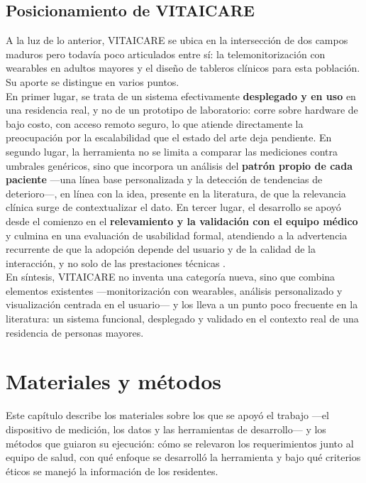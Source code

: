 \subsection{Posicionamiento de VITAICARE}
A la luz de lo anterior, VITAICARE se ubica en la intersección de dos campos maduros pero todavía poco articulados entre sí: la telemonitorización con wearables en adultos mayores y el diseño de tableros clínicos para esta población. Su aporte se distingue en varios puntos.\\

En primer lugar, se trata de un sistema efectivamente \textbf{desplegado y en uso} en una residencia real, y no de un prototipo de laboratorio: corre sobre hardware de bajo costo, con acceso remoto seguro, lo que atiende directamente la preocupación por la escalabilidad que el estado del arte deja pendiente. En segundo lugar, la herramienta no se limita a comparar las mediciones contra umbrales genéricos, sino que incorpora un análisis del \textbf{patrón propio de cada paciente} —una línea base personalizada y la detección de tendencias de deterioro—, en línea con la idea, presente en la literatura, de que la relevancia clínica surge de contextualizar el dato. En tercer lugar, el desarrollo se apoyó desde el comienzo en el \textbf{relevamiento y la validación con el equipo médico} y culmina en una evaluación de usabilidad formal, atendiendo a la advertencia recurrente de que la adopción depende del usuario y de la calidad de la interacción, y no solo de las prestaciones técnicas \cite{moore2021,siette2023}.\\

En síntesis, VITAICARE no inventa una categoría nueva, sino que combina elementos existentes —monitorización con wearables, análisis personalizado y visualización centrada en el usuario— y los lleva a un punto poco frecuente en la literatura: un sistema funcional, desplegado y validado en el contexto real de una residencia de personas mayores.\\


\section{Materiales y métodos}
Este capítulo describe los materiales sobre los que se apoyó el trabajo —el dispositivo de medición, los datos y las herramientas de desarrollo— y los métodos que guiaron su ejecución: cómo se relevaron los requerimientos junto al equipo de salud, con qué enfoque se desarrolló la herramienta y bajo qué criterios éticos se manejó la información de los residentes.\\


